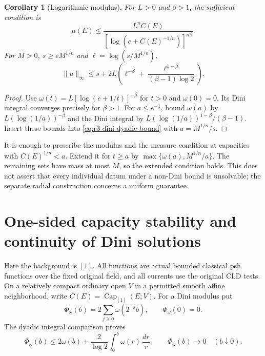 \documentclass[11pt,a4paper]{article}
\numberwithin{equation}{section}
\newtheorem{corollary}[theorem]{Corollary}
\theoremstyle{definition}
\theoremstyle{remark}
\begin{document}
\begin{corollary}[Logarithmic modulus]
\label{cor:r3-dini-logarithmic}
For $L>0$ and $\beta>1$, the sufficient condition is
\begin{equation}\label{eq:r3-dini-logarithmic-hypothesis}
 \mu(E)\leq
 \frac{L^n C(E)}{[\log(e+C(E)^{-1/n})]^{n\beta}}.
\end{equation}
For $M>0$, $s\geq eM^{1/n}$ and $\ell=\log(s/M^{1/n})$,
\begin{equation}\label{eq:r3-dini-log-bound}
 \|u\|_\infty\leq
 s+2L\left(\ell^{-\beta}
       +\frac{\ell^{1-\beta}}{(\beta-1)\log2}\right).
\end{equation}
\end{corollary}
\begin{proof}
Use $\omega(t)=L[\log(e+1/t)]^{-\beta}$ for $t>0$ and
$\omega(0)=0$. Its Dini integral converges precisely for $\beta>1$.
For $a\leq e^{-1}$, bound $\omega(a)$ by
$L(\log(1/a))^{-\beta}$ and the Dini integral by
$L(\log(1/a))^{1-\beta}/(\beta-1)$. Insert these bounds into
\eqref{eq:r3-dini-dyadic-bound} with $a=M^{1/n}/s$.
\end{proof}

It is enough to prescribe the modulus and the measure condition
at capacities with $C(E)^{1/n}<a$. Extend it for $t\geq a$ by
$\max\{\omega(a),M^{1/n}/a\}$. The remaining sets have mass at
most $M$, so the extended condition holds. This does not assert
that every individual datum under a non-Dini bound is unsolvable;
the separate radial construction concerns a uniform guarantee.



\section{One-sided capacity stability and continuity of Dini solutions}
\label{sec:r3-dini-stability-continuity}

Here the background is $[1]$. All functions are actual bounded
classical psh functions over the fixed original field, and all
currents use the original CLD tests. On a relatively compact ordinary
open $V$ in a permitted smooth affine neighborhood, write
$C(E)=\operatorname{Cap}_{[1]}(E;V)$. For a Dini modulus put
\[
 \Phi_\omega(b)=2\sum_{j\geq0}\omega(2^{-j}b),\qquad
 \Phi_\omega(0)=0.
\]
The dyadic integral comparison proves
\begin{equation}\label{eq:r3-stability-dyadic-tail}
 \Phi_\omega(b)\leq2\omega(b)+\frac2{\log2}
          \int_0^b\omega(r)\,\frac{dr}{r},\qquad
 \Phi_\omega(b)\longrightarrow0\quad(b\downarrow0).
\end{equation}
\end{document}
